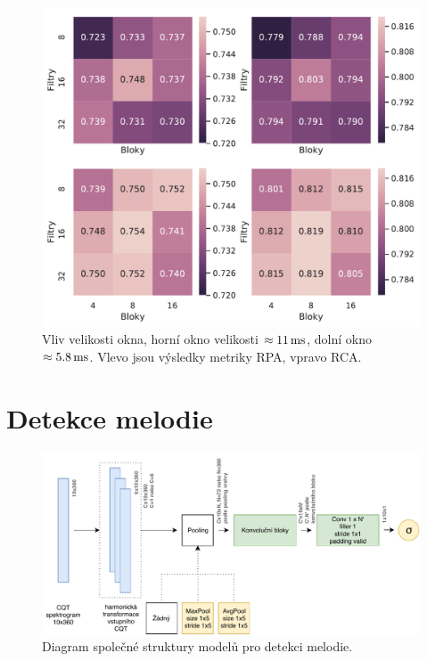 \begin{figure}[h]\centering
    \includegraphics[scale=0.6]{../img/figures/spectrogram_512_vs_256}
\caption{Vliv velikosti okna, horní okno velikosti $\approx 11\,\rm ms$, dolní okno $\approx 5.8\,\rm ms$. Vlevo jsou výsledky metriky RPA, vpravo RCA.}\label{obr:spectrogram_512_vs_256}
\end{figure}

\section{Detekce melodie}

\begin{figure}[h]\centering
    \includegraphics[width=\textwidth,height=\textheight,keepaspectratio]{../img/voicing_struktura}
\caption{Diagram společné struktury modelů pro detekci melodie.}\label{obr:voicing_struktura}
\end{figure}

